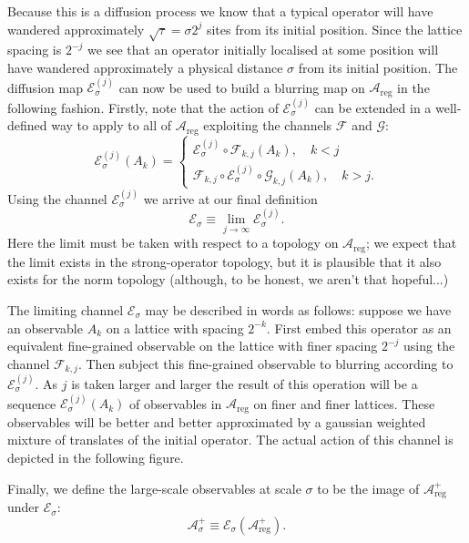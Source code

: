 \documentclass[11pt]{amsart}
\theoremstyle{plain}%
\theoremstyle{definition}
\theoremstyle{remark}
\begin{document}
Because this is a diffusion process we know that a typical operator will have wandered approximately $\sqrt{\tau} = \sigma 2^j$ sites from its initial position. Since the lattice spacing is $2^{-j}$ we see that an operator initially localised at some position will have wandered approximately a physical distance $\sigma$ from its initial position. The diffusion map $\mathcal{E}_\sigma^{(j)}$ can now be used to build a blurring map on $\mathcal{A}_{\text{reg}}$ in the following fashion. Firstly, note that the action of $\mathcal{E}_\sigma^{(j)}$ can be extended in a well-defined way to apply to all of $\mathcal{A}_{\text{reg}}$ exploiting the channels $\mathcal{F}$ and $\mathcal{G}$:
\begin{equation}
	\mathcal{E}_\sigma^{(j)}(A_k) = \begin{cases} \mathcal{E}_\sigma^{(j)}\circ\mathcal{F}_{k,j}(A_k), \quad k < j \\
	\mathcal{F}_{k,j}\circ\mathcal{E}_\sigma^{(j)}\circ\mathcal{G}_{k,j}(A_k), \quad k > j. \end{cases}
\end{equation}
Using the channel $\mathcal{E}_\sigma^{(j)}$ we arrive at our final definition
\begin{equation}
	\mathcal{E}_\sigma \equiv \lim_{j\rightarrow \infty} \mathcal{E}_\sigma^{(j)}.
\end{equation}
Here the limit must be taken with respect to a topology on $\mathcal{A}_{\text{reg}}$; we expect that the limit exists in the strong-operator topology, but it is plausible that it also exists for the norm topology (although, to be honest, we aren't that hopeful...) 

The limiting channel $\mathcal{E}_\sigma$ may be described in words as follows: suppose we have an observable $A_k$ on a lattice with spacing $2^{-k}$. First embed this operator as an equivalent fine-grained observable on the lattice with finer spacing $2^{-j}$ using the channel $\mathcal{F}_{k,j}$. Then subject this fine-grained observable to blurring according to $\mathcal{E}_\sigma^{(j)}$. As $j$ is taken larger and larger the result of this operation will be a sequence $\mathcal{E}_\sigma^{(j)}(A_k)$ of observables in $\mathcal{A}_{\text{reg}}$ on finer and finer lattices. These observables will be better and better approximated by a gaussian weighted mixture of translates of the initial operator. The actual action of this channel is depicted in the following figure. 

Finally, we define the large-scale observables at scale $\sigma$ to be the image of $\mathcal{A}_{\text{reg}}^+$ under $\mathcal{E}_\sigma$:
\begin{equation}
	\mathcal{A}_\sigma^+ \equiv \mathcal{E}_\sigma(\mathcal{A}_{\text{reg}}^+).
\end{equation}
\end{document}
